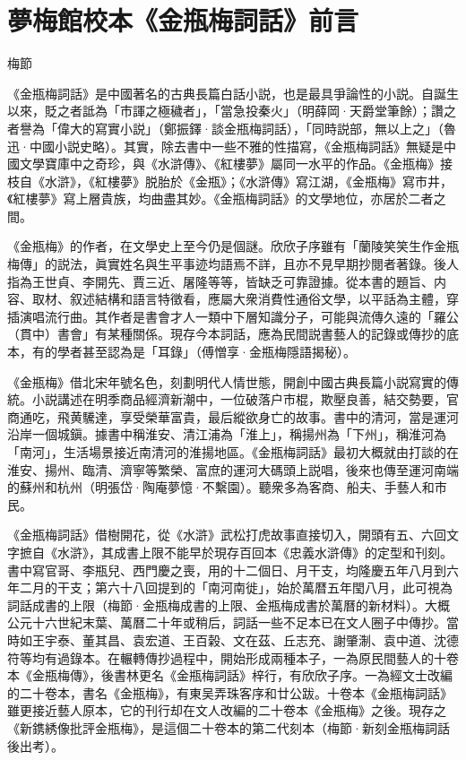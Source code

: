 \chapter*{夢梅館校本《金瓶梅詞話》前言}

\begin{declareqianyan}
梅節\qquad\ 
\end{declareqianyan}

《金瓶梅詞話》是中國著名的古典長篇白話小説，也是最具爭論性的小説。自誕生以來，貶之者詆為「市諢之極穢者」，「當急投秦火」{\innerzhushi（明薛岡·天爵堂筆餘）}；讚之者譽為「偉大的寫實小説」{\innerzhushi（鄭振鐸·談金瓶梅詞話）}，「同時説部，無以上之」{\innerzhushi（魯迅·中國小説史略）}。其實，除去書中一些不雅的性描寫，《金瓶梅詞話》無疑是中國文學寶庫中之奇珍，與《水滸傳》、《紅樓夢》屬同一水平的作品。《金瓶梅》接枝自《水滸》，《紅樓夢》脱胎於《金瓶》；《水滸傳》寫江湖，《金瓶梅》寫市井，《紅樓夢》寫上層貴族，均曲盡其妙。《金瓶梅詞話》的文學地位，亦居於二者之間。

《金瓶梅》的作者，在文學史上至今仍是個謎。欣欣子序雖有「蘭陵笑笑生作金瓶梅傳」的説法，眞實姓名與生平事迹均語焉不詳，且亦不見早期抄閱者著錄。後人指為王世貞、李開先、賈三近、屠隆等等，皆缺乏可靠證據。從本書的題旨、内容、取材、叙述結構和語言特徵看，應屬大衆消費性通俗文學，以平話為主體，穿插演唱流行曲。其作者是書會才人一類中下層知識分子，可能與流傳久遠的「羅公（貫中）書會」有某種關係。現存今本詞話，應為民間説書藝人的記錄或傳抄的底本，有的學者甚至認為是「耳錄」{\innerzhushi（傅憎享·金瓶梅隱語揭秘）}。

《金瓶梅》借北宋年號名色，刻劃明代人情世態，開創中國古典長篇小説寫實的傳統。小説講述在明季商品經濟新潮中，一位破落户市棍，欺壓良善，結交勢要，官商通吃，飛黄驣達，享受榮華富貴，最后縱欲身亡的故事。書中的清河，當是運河沿岸一個城鎭。據書中稱淮安、清江浦為「淮上」，稱揚州為「下州」，稱淮河為「南河」，生活場景接近南清河的淮揚地區。《金瓶梅詞話》最初大概就由打談的在淮安、揚州、臨清、濟寧等繁榮、富庶的運河大碼頭上説唱，後來也傳至運河南端的蘇州和杭州{\innerzhushi（明張岱·陶庵夢憶·不繫園）}。聽衆多為客商、船夫、手藝人和市民。

《金瓶梅詞話》借樹開花，從《水滸》武松打虎故事直接切入，開頭有五、六回文字摭自《水滸》，其成書上限不能早於現存百回本《忠義水滸傳》的定型和刊刻。書中寫官哥、李瓶兒、西門慶之喪，用的十二個日、月干支，均隆慶五年八月到六年二月的干支；第六十八回提到的「南河南徙」，始於萬暦五年閠八月，此可視為詞話成書的上限{\innerzhushi（梅節·金瓶梅成書的上限、金瓶梅成書於萬曆的新材料）}。大概公元十六世紀末葉、萬曆二十年或稍后，詞話一些不足本已在文人圈子中傳抄。當時如王宇泰、董其昌、袁宏道、王百榖、文在茲、丘志充、謝肇淛、袁中道、沈德符等均有過錄本。在輾轉傳抄過程中，開始形成兩種本子，一為原民間藝人的十卷本《金瓶梅傳》，後書林更名《金瓶梅詞話》梓行，有欣欣子序。一為經文士改編的二十卷本，書名《金瓶梅》，有東吴弄珠客序和廿公跋。十卷本《金瓶梅詞話》雖更接近藝人原本，它的刊行却在文人改編的二十卷本《金瓶梅》之後。現存之《新鎸綉像批評金瓶梅》，是這個二十卷本的第二代刻本{\innerzhushi（梅節·新刻金瓶梅詞話後出考）}。

